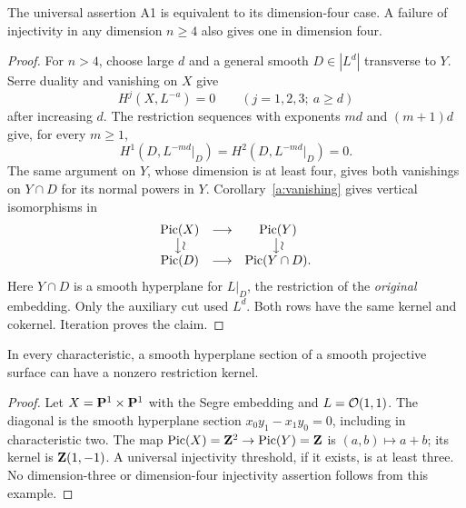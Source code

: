\begin{proposition}\label{a:fourfold}
The universal assertion A1 is equivalent to its dimension-four case.
A failure of injectivity in any dimension $n\geq4$ also gives one in
dimension four.
\end{proposition}
\begin{proof}
For $n>4$, choose large $d$ and a general smooth $D\in|L^d|$ transverse
to $Y$.  Serre duality and vanishing on $X$ give
\[
 H^j(X,L^{-a})=0\qquad(j=1,2,3;\ a\geq d)
\]
after increasing $d$.  The restriction sequences with exponents $md$
and $(m+1)d$ give, for every $m\geq1$,
\[
 H^1(D,L^{-md}|_D)=H^2(D,L^{-md}|_D)=0.
\]  The same argument on $Y$, whose dimension is at least four,
gives both vanishings on $Y\cap D$ for its normal powers in $Y$.
Corollary~\ref{a:vanishing} gives vertical isomorphisms in
\[
 \begin{matrix}
 \operatorname{Pic}(X)&\longrightarrow&\operatorname{Pic}(Y)\\
 \big\downarrow\wr&&\big\downarrow\wr\\
 \operatorname{Pic}(D)&\longrightarrow&\operatorname{Pic}(Y\cap D).
 \end{matrix}
\]
Here $Y\cap D$ is a smooth hyperplane for $L|_D$, the restriction of the
\emph{original} embedding.  Only the auxiliary cut used $L^d$.
Both rows have the same kernel and cokernel.  Iteration proves the claim.
\end{proof}

\begin{proposition}\label{a:segre}
In every characteristic, a smooth hyperplane section of a smooth
projective surface can have a nonzero restriction kernel.
\end{proposition}
\begin{proof}
Let $X=\mathbf P^1\times\mathbf P^1$ with the Segre embedding and
$L=\mathcal O(1,1)$.  The diagonal is the smooth hyperplane section
$x_0y_1-x_1y_0=0$, including in characteristic two.
The map $\operatorname{Pic}(X)=\mathbf Z^2\to\operatorname{Pic}(Y)=\mathbf Z$ is $(a,b)\mapsto a+b$;
its kernel is $\mathbf Z(1,-1)$.  A universal injectivity threshold, if it
exists, is at least three.  No dimension-three or dimension-four
injectivity assertion follows from this example.
\end{proof}

